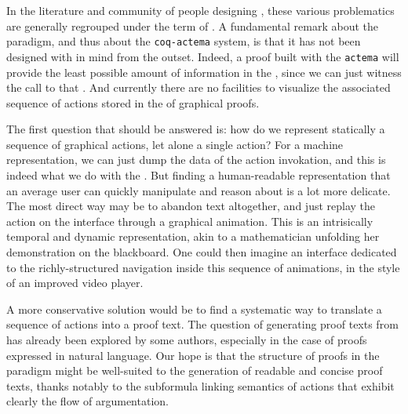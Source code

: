 In the literature and community of people designing , these
various problematics are generally regrouped under the term of . A fundamental remark about the  paradigm, and thus about the
\texttt{coq-actema} system, is that it has not been designed with  in mind from the outset. Indeed, a proof built with the
\texttt{actema}  will provide the least possible amount of information in
the , since we can just witness the call to that . And
currently there are no facilities to visualize the associated sequence of
actions stored in the  of graphical proofs.

The first question that should be answered is: how do we represent statically a
sequence of graphical actions, let alone a single action? For a machine
representation, we can just dump the data of the action invokation, and this is
indeed what we do with the . But finding a human-readable
representation that an average user can quickly manipulate and reason about is a
lot more delicate. The most direct way may be to abandon text altogether, and
just replay the action on the interface through a graphical animation. This is
an intrisically temporal and dynamic representation, akin to a mathematician
unfolding her demonstration on the blackboard. One could then imagine an
interface dedicated to the richly-structured navigation inside this sequence of
animations, in the style of an improved video player.

A more conservative solution would be to find a systematic way to translate a
sequence of actions into a proof text. The question of generating 
proof texts from   has already been explored by some
authors, especially in the case of proofs expressed in natural
language. Our hope is that the structure of proofs
in the  paradigm might be well-suited to the generation of
readable and concise proof texts, thanks notably to the subformula linking
semantics of  actions that exhibit clearly the flow of argumentation.

